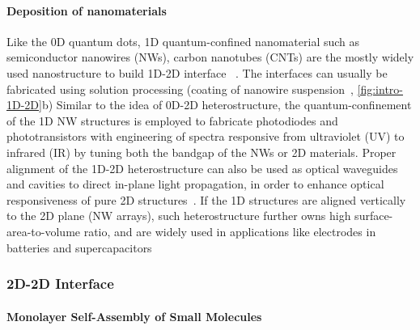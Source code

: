 \paragraph{Deposition of nano\-materials}
Like the 0D quantum dots, 1D quantum-confined nano\-material such as
semiconductor nanowires (NWs), carbon nano\-tubes (CNTs) are the
mostly widely used nano\-structure to build 1D-2D interface
~\cite{Jariwala_2013_CNT-mos2,Jariwala_2014_solution_CNT,Fu_2012_gr_ZnONW,Wu_2010_NW_supercap,Gan_2013_Si_WG}.
%
The interfaces can usually be fabricated using solution processing
(\eg coating of nanowire suspension~\cite{Jariwala_2014_solution_CNT},
\autoref{fig:intro-1D-2D}b)
%
Similar to the idea of 0D-2D heterostructure, the quantum-confinement
of the 1D NW structures is employed to fabricate photo\-diodes and
photo\-transistors with engineering of spectra responsive from
ultraviolet (UV) to infrared (IR) \cite{Nie_2013_NW_array,Gao_2013_NW_gr,Miao_2014_NW_IR,Jariwala_2013_CNT-mos2,Spina_2015_perov_nw}
by tuning both the bandgap of the NWs or 2D materials.
%
Proper alignment of the 1D-2D heterostructure can also be used as
optical waveguides and cavities to direct in-plane light propagation,
in order to enhance optical responsiveness of pure 2D structures~\cite{Gan_2013_Si_WG,Pospischil_2013_CMOS}.
%
If the 1D structures are aligned vertically to the 2D plane (\ie NW
arrays), such heterostructure further owns high surface-area-to-volume
ratio, and are widely used in applications like electrodes in
batteries and super\-capacitors \cite{Wu_2010_NW_supercap,Liu_2011_V2O5NW}


\subsubsection{2D-2D Interface}
\label{sec:intro-2D-2D}

\paragraph{Monolayer Self-Assembly of Small Molecules}
\label{sec:orgfd77377}

